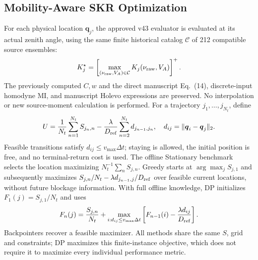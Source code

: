 \subsection{Mobility-Aware SKR Optimization}
For each physical location $\boldsymbol q_j$, the approved v43 evaluator
is evaluated at its actual zenith angle, using the same finite historical
catalog $\mathcal C$ of 212 compatible source ensembles:
\begin{equation}
 K_j^\star=\left[\max_{(\nu_{\rm raw},V_A)\in\mathcal C}
 K_j(\nu_{\rm raw},V_A)\right]^+ .\label{eq:phaseD_catalog}
\end{equation}
The previously computed $C,w$ and the direct manuscript Eq.~(14),
discrete-input homodyne MI, and manuscript Holevo expressions are preserved.
No interpolation or new source-moment calculation is performed.
For a trajectory $j_1,\ldots,j_{N_t}$, define
\begin{equation}
 U=\frac1{N_t}\sum_{n=1}^{N_t}S_{j_n,n}
 -\frac{\lambda}{D_{\rm ref}}\sum_{n=2}^{N_t}d_{j_{n-1},j_n},\quad
 d_{ij}=\|\boldsymbol q_i-\boldsymbol q_j\|_2 .\label{eq:phaseD_objective}
\end{equation}
Feasible transitions satisfy $d_{ij}\le v_{\max}\Delta t$; staying is
allowed, the initial position is free, and no terminal-return cost is used.
The offline Stationary benchmark selects the location maximizing
$N_t^{-1}\sum_n S_{j,n}$. Greedy starts at $\arg\max_j S_{j,1}$ and
subsequently maximizes $S_{j,n}/N_t-\lambda d_{j_{n-1},j}/D_{\rm ref}$
over feasible current locations, without future blockage information.
With full offline knowledge, DP initializes $F_1(j)=S_{j,1}/N_t$ and uses
\begin{equation}
 F_n(j)=\frac{S_{j,n}}{N_t}+\max_{i:d_{ij}\le v_{\max}\Delta t}
 \left[F_{n-1}(i)-\frac{\lambda d_{ij}}{D_{\rm ref}}\right].
 \label{eq:phaseD_dp}
\end{equation}
Backpointers recover a feasible maximizer. All methods share the same
$S$, grid and constraints; DP maximizes this finite-instance objective,
which does not require it to maximize every individual performance metric.
